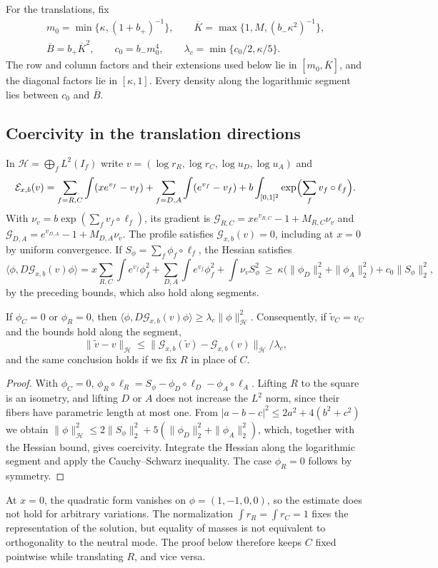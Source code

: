 For the translations, fix \begin{gather*}
 m_0=\min\{\kappa,(1+b_+)^{-1}\},\qquad \overline K=\max\{1,M,(b_-\kappa^2)^{-1}\},\\
 \overline B=b_+\overline K^2,\qquad c_0=b_-m_0^4,\qquad \lambda_c=\min\{c_0/2,\kappa/5\}.
\end{gather*} The row and column factors and their extensions used below lie in $[m_0,\overline K]$, and the
diagonal factors lie in
$[\kappa,1]$. Every density along the logarithmic segment lies between $c_0$ and $\overline B$.

\subsection{Coercivity in the translation directions}

In $\mathcal H=\bigoplus_fL^2(I_f)$ write $v=(\log r_R,\log r_C,\log u_D,\log u_A)$ and \[
 \mathcal E_{x,b}(v)=\sum_{f=R,C}\int(xe^{v_f}-v_f)+\sum_{f=D,A}\int(e^{v_f}-v_f)
 +b\int_{[0,1]^2}\exp\Bigl(\sum_fv_f\circ\ell_f\Bigr).
\] With $\nu_v=b\exp(\sum_fv_f\circ\ell_f)$, its gradient is $\mathcal G_{R,C}=xe^{v_{R,C}}-1+M_{R,C}\nu_v$
and $\mathcal
G_{D,A}=e^{v_{D,A}}-1+M_{D,A}\nu_v$. The profile satisfies $\mathcal
G_{x,b}(v)=0$, including at $x=0$ by uniform convergence. If
$S_\phi=\sum_f\phi_f\circ\ell_f$, the Hessian satisfies \[
 \langle\phi,D\mathcal G_{x,b}(v)\phi\rangle=x\sum_{R,C}\int e^{v_f}\phi_f^2+\sum_{D,A}\int e^{v_f}\phi_f^2
 +\int\nu_vS_\phi^2\ \ge\ \kappa\bigl(\|\phi_D\|_2^2+\|\phi_A\|_2^2\bigr)+c_0\|S_\phi\|_2^2 ,
\] by the preceding bounds, which also hold along segments.

\begin{lema}\label{lem:coercividad} If $\phi_C=0$ or
$\phi_R=0$, then
$\langle\phi,D\mathcal G_{x,b}(v)\phi\rangle\ge\lambda_c\|\phi\|_{\mathcal H}^2$. Consequently, if
$\widetilde v_C=v_C$ and the bounds
hold along the segment, \[
 \|\widetilde v-v\|_{\mathcal H}\le\|\mathcal G_{x,b}(\widetilde v)-\mathcal
G_{x,b}(v)\|_{\mathcal H}/\lambda_c ,
\] and the same conclusion holds if we fix $R$ in place of $C$. \end{lema}

\begin{proof} With $\phi_C=0$, $\phi_R\circ\ell_R=S_\phi-\phi_D\circ\ell_D-\phi_A\circ\ell_A$. Lifting $R$
to the square is an
isometry, and lifting $D$ or $A$ does not increase the $L^2$ norm, since their fibers have parametric length
at most one. From
$|a-b-c|^2\le2a^2+4(b^2+c^2)$ we obtain
$\|\phi\|_{\mathcal H}^2\le2\|S_\phi\|_2^2+5(\|\phi_D\|_2^2+\|\phi_A\|_2^2)$, which, together
with the Hessian bound, gives coercivity. Integrate the Hessian along the logarithmic segment and apply the
Cauchy--Schwarz inequality.
The case $\phi_R=0$ follows by symmetry. \end{proof}

At $x=0$, the quadratic form vanishes on $\phi=(1,-1,0,0)$, so the estimate does not hold for arbitrary
variations. The normalization
$\int r_R=\int r_C=1$ fixes the representation of the solution, but equality of masses is not equivalent to
orthogonality to the neutral
mode. The proof below therefore keeps $C$ fixed pointwise while translating $R$, and vice versa.
